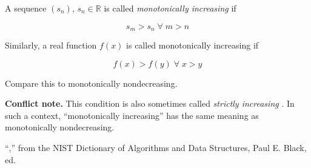 \documentclass{article}
\begin{document}
A sequence $(s_n)$, $s_n \in \mathbb{R} $ is called \emph{monotonically increasing} if 

$$ s_m > s_n \; \forall \; m > n $$

Similarly, a real function $f(x)$ is called monotonically increasing if 

$$ f(x) > f(y) \; \forall \; x > y $$

Compare this to monotonically nondecreasing.

\textbf{Conflict note.}  This condition is also sometimes called \emph{strictly increasing} \cite{NIST}.  In such a context, ``monotonically increasing'' has the same meaning as monotonically nondecreasing.

\begin{thebibliography}{3}
 ``,'' from the NIST Dictionary of Algorithms and Data Structures, Paul E. Black, ed.
\end{thebibliography}
\end{document}
